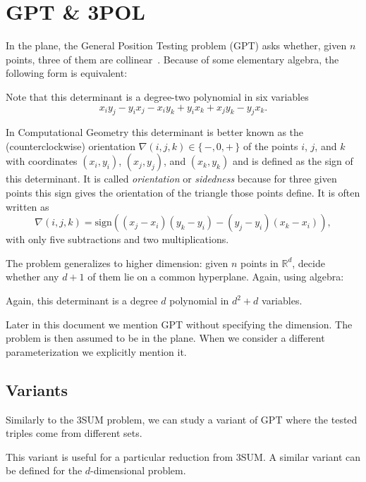 \section{GPT \& 3POL}\label{sec:problem:pol}

In the plane, the General Position Testing problem (GPT) asks whether, given
\(n\) points, three of them are collinear~\cite{???}.
%
Because of some elementary algebra, the following form is equivalent:
%


Note that this determinant is a degree-two polynomial in six variables
\begin{displaymath}
	x_i y_j - y_i x_j - x_i y_k + y_i x_k + x_j y_k - y_j x_k.
\end{displaymath}

In Computational Geometry this determinant is better known as
the (counterclockwise) orientation \(\nabla(i,j,k) \in \{\, -, 0, +\,\}\) of
the points
\(i\), \(j\), and \(k\) with coordinates \((x_i, y_i)\), \((x_j, y_j)\), and
\((x_k, y_k)\) and is defined as the sign of this determinant.
%
It is called \emph{orientation} or \emph{sidedness}
because for three given points this sign
gives the orientation of the triangle those points define.
%
It is often written as
\begin{displaymath}
    \nabla(i,j,k) = \mathrm{sign}((x_j - x_i)(y_k - y_i) - (y_j - y_i)(x_k - x_i)),
\end{displaymath}
with only five subtractions and two multiplications.

The problem generalizes to higher dimension: given \(n\) points in
\(\mathbb{R}^d\), decide whether any \(d+1\) of them lie on a common
hyperplane. Again, using algebra:
%


Again, this determinant is a degree \(d\) polynomial in
\(d^2 + d\) variables.

Later in this document we mention GPT without specifying the dimension.
The problem is then assumed to be in the plane.
When we consider a different parameterization we explicitly mention it.

\subsection{Variants}

Similarly to the 3SUM problem, we can study a
variant of GPT where the tested triples come from different sets.
%


This variant is useful for a particular reduction from 3SUM.
A similar variant can be defined for the \(d\)-dimensional problem.


